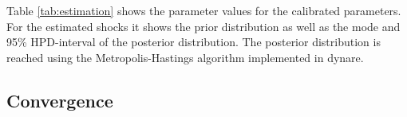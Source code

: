 Table \ref{tab:estimation} shows the parameter values for the calibrated
parameters. For the estimated shocks it shows the prior distribution as well as
the mode and 95\% HPD-interval of the posterior distribution. The posterior
distribution is reached using the Metropolis-Hastings algorithm implemented in dynare.


\subsection{Convergence}
\label{sec:convergence}
